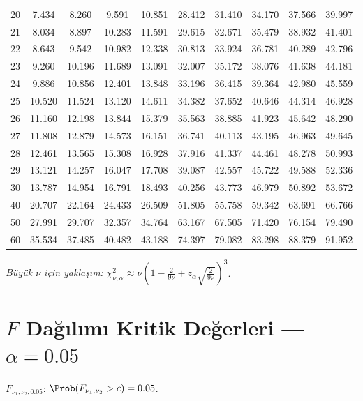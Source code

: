 \begin{center}
\begin{tabular}{r|ccccccccc}
20 & 7.434 & 8.260 & 9.591 & 10.851 & 28.412 & 31.410 & 34.170 & 37.566 & 39.997 \\
21 & 8.034 & 8.897 & 10.283 & 11.591 & 29.615 & 32.671 & 35.479 & 38.932 & 41.401 \\
22 & 8.643 & 9.542 & 10.982 & 12.338 & 30.813 & 33.924 & 36.781 & 40.289 & 42.796 \\
23 & 9.260 & 10.196 & 11.689 & 13.091 & 32.007 & 35.172 & 38.076 & 41.638 & 44.181 \\
24 & 9.886 & 10.856 & 12.401 & 13.848 & 33.196 & 36.415 & 39.364 & 42.980 & 45.559 \\
25 & 10.520 & 11.524 & 13.120 & 14.611 & 34.382 & 37.652 & 40.646 & 44.314 & 46.928 \\
26 & 11.160 & 12.198 & 13.844 & 15.379 & 35.563 & 38.885 & 41.923 & 45.642 & 48.290 \\
27 & 11.808 & 12.879 & 14.573 & 16.151 & 36.741 & 40.113 & 43.195 & 46.963 & 49.645 \\
28 & 12.461 & 13.565 & 15.308 & 16.928 & 37.916 & 41.337 & 44.461 & 48.278 & 50.993 \\
29 & 13.121 & 14.257 & 16.047 & 17.708 & 39.087 & 42.557 & 45.722 & 49.588 & 52.336 \\
30 & 13.787 & 14.954 & 16.791 & 18.493 & 40.256 & 43.773 & 46.979 & 50.892 & 53.672 \\
40 & 20.707 & 22.164 & 24.433 & 26.509 & 51.805 & 55.758 & 59.342 & 63.691 & 66.766 \\
50 & 27.991 & 29.707 & 32.357 & 34.764 & 63.167 & 67.505 & 71.420 & 76.154 & 79.490 \\
60 & 35.534 & 37.485 & 40.482 & 43.188 & 74.397 & 79.082 & 83.298 & 88.379 & 91.952 \\
\hline
\end{tabular}
\end{center}

\noindent\textit{Büyük $\nu$ için yaklaşım:} $\chi^2_{\nu,\alpha}\approx\nu\!\left(1-\tfrac{2}{9\nu}+z_\alpha\sqrt{\tfrac{2}{9\nu}}\right)^3$.

\section{$F$ Dağılımı Kritik Değerleri --- $\alpha=0.05$}
\label{app:f_tablo_05}

$F_{\nu_1,\nu_2,0.05}$: $\Prob(F_{\nu_1,\nu_2} > c) = 0.05$.

